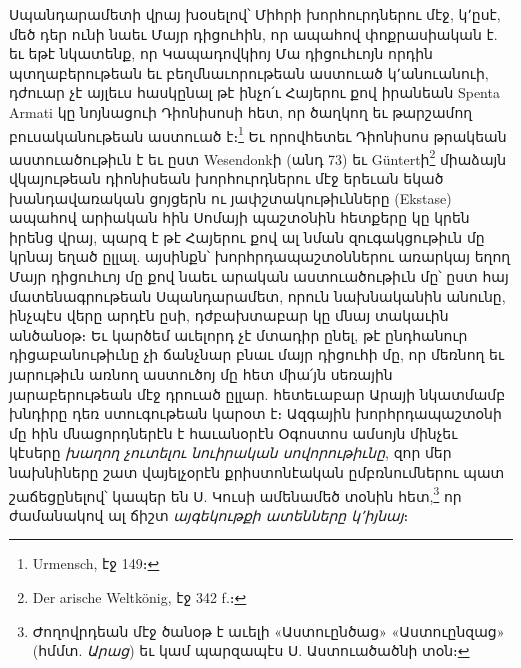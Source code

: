 \documentclass{article}
\begin{document}
{Սպանդարամետի վրայ խօսելով՝ Միհրի խորհուրդներու մէջ, կ՚ըսէ, մեծ դեր ունի նաեւ Մայր դիցուհին, որ ապահով փոքրասիական է. եւ եթէ նկատենք, որ Կապադովկիոյ Մա դիցուհւոյն որդին պտղաբերութեան եւ բեղմնաւորութեան աստուած կ՚անուանուի, դժուար չէ այլեւս հասկընալ թէ ինչո՛ւ Հայերու քով իրանեան Spenta Armati կը նոյնացուի Դիոնիսոսի հետ, որ ծաղկող եւ թարշամող բուսականութեան աստուած է։\footnote{Urmensch, էջ 149։} Եւ որովհետեւ Դիոնիսոս թրակեան աստուածութիւն է եւ ըստ Wesendonkի (անդ 73) եւ Güntertի\footnote{Der arische Weltkönig, էջ 342 f.։} միաձայն վկայութեան դիոնիսեան խորհուրդներու մէջ երեւան եկած խանդավառական ցոյցերն ու յափշտակութիւնները (Ekstase) ապահով արիական հին Սոմայի պաշտօնին հետքերը կը կրեն իրենց վրայ, պարզ է թէ Հայերու քով ալ նման զուգակցութիւն մը կրնայ եղած ըլլալ. այսինքն՝ խորհրդապաշտօններու առարկայ եղող Մայր դիցուհւոյ մը քով նաեւ արական աստուածութիւն մը՝ ըստ հայ մատենագրութեան Սպանդարամետ, որուն նախնականին անունը, ինչպէս վերը արդէն ըսի, դժբախտաբար կը մնայ տակաւին անծանօթ։ Եւ կարծեմ աւելորդ չէ մտադիր ընել, թէ ընդհանուր դիցաբանութիւնը չի ճանչնար բնաւ մայր դիցուհի մը, որ մեռնող եւ յարութիւն առնող աստուծոյ մը հետ միա՛յն սեռային յարաբերութեան մէջ դրուած ըլլար. հետեւաբար Արայի նկատմամբ խնդիրը դեռ ստուգութեան կարօտ է։ Ազգային խորհրդապաշտօնի մը հին մնացորդներէն է հաւանօրէն Օգոստոս ամսոյն մինչեւ կէսերը \emph{խաղող չուտելու նուիրական սովորութիւնը}, զոր մեր նախնիները շատ վայելչօրէն քրիստոնէական ըմբռնումներու պատ շաճեցընելով՝ կապեր են Ս. Կուսի ամենամեծ տօնին հետ,\footnote{Ժողովրդեան մէջ ծանօթ է աւելի «Աստուընծաց» «Աստուընզաց» (հմմտ. \emph{Արաց}) եւ կամ պարզապէս Ս. Աստուածածնի տօն։} որ ժամանակով ալ ճիշտ \emph{այգեկութքի ատենները կ՚իյնայ}։

}
\end{document}
